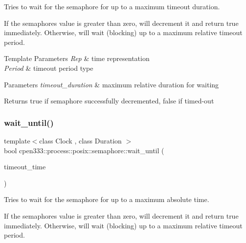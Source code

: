 Tries to wait for the semaphore for up to a maximum timeout duration. 

If the semaphore\textquotesingle{}s value is greater than zero, will decrement it and return true immediately. Otherwise, will wait (blocking) up to a maximum relative timeout period.


\begin{DoxyTemplParams}{Template Parameters}
{\em Rep} & time representation \\
\hline
{\em Period} & timeout period type \\
\hline
\end{DoxyTemplParams}

\begin{DoxyParams}{Parameters}
{\em timeout\+\_\+duration} & maximum relative duration for waiting \\
\hline
\end{DoxyParams}
\begin{DoxyReturn}{Returns}
true if semaphore successfully decremented, false if timed-\/out 
\end{DoxyReturn}
\mbox{\label{classcpen333_1_1process_1_1posix_1_1semaphore_a83443f24c1b7b11e5384975e9abc77dc}} 
\subsubsection{\texorpdfstring{wait\+\_\+until()}{wait\_until()}}
{\footnotesize\ttfamily template$<$class Clock , class Duration $>$ \\
bool cpen333\+::process\+::posix\+::semaphore\+::wait\+\_\+until (\begin{DoxyParamCaption}\item[{const std\+::chrono\+::time\+\_\+point$<$ Clock, Duration $>$ \&}]{timeout\+\_\+time }\end{DoxyParamCaption})\hspace{0.3cm}{\ttfamily [inline]}}



Tries to wait for the semaphore for up to a maximum absolute time. 

If the semaphore\textquotesingle{}s value is greater than zero, will decrement it and return true immediately. Otherwise, will wait (blocking) up to a maximum relative timeout period.



